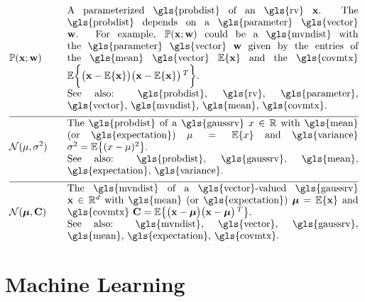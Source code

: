 \begin{align} 
	&\prob{\featurevec;\weights} &\quad & \parbox{.85\textwidth}{A parameterized \gls{probdist} of an \gls{rv} $\featurevec$. 
		The \gls{probdist} depends on a \gls{parameter} \gls{vector} $\weights$. For example, $\prob{\featurevec;\weights}$ could be a 
		\gls{mvndist} with the \gls{parameter} \gls{vector} $\weights$ given by the entries of the \gls{mean} \gls{vector} $\expect \{ \featurevec \}$ 
		and the \gls{covmtx} $\expect \bigg \{ \big( \featurevec - \expect \{ \featurevec \}\big) \big( \featurevec - \expect \{ \featurevec \}\big)\,^{T}  \bigg\}$.
		\\ See also: \gls{probdist}, \gls{rv}, \gls{parameter}, \gls{vector}, \gls{mvndist}, \gls{mean}, \gls{covmtx}.} \nonumber \\[2mm] \hline \nonumber\\[-5mm]
	&\mathcal{N}(\mu, \sigma^{2}) &\quad & \parbox{.85\textwidth}{The \gls{probdist} of a 
		\gls{gaussrv} $\feature \in \mathbb{R}$ with \gls{mean} (or \gls{expectation}) $\mu= \expect \{ \feature \}$ 
		and \gls{variance} $\sigma^{2} =   \expect \big\{  (  \feature - \mu )^2 \big\}$.
		\\ See also: \gls{probdist}, \gls{gaussrv}, \gls{mean}, \gls{expectation}, \gls{variance}.} \nonumber \\[2mm] \hline \nonumber\\[-5mm]
	&\mathcal{N}(\meanvecgeneric, \mathbf{C}) &\quad & \parbox{.85\textwidth}{The \gls{mvndist} of a \gls{vector}-valued 
		\gls{gaussrv} $\featurevec \in \mathbb{R}^{\featuredim}$ with \gls{mean} (or \gls{expectation}) $\clustermean= \expect \{ \featurevec \}$ 
		and \gls{covmtx} $\mathbf{C} =  \expect \big\{ \big( \featurevec - \clustermean \big)\big( \featurevec - \clustermean \big)\,^{T} \big\}$.
		\\ See also: \gls{mvndist}, \gls{vector}, \gls{gaussrv}, \gls{mean}, \gls{expectation}, \gls{covmtx}.} \nonumber                                             
\end{align}





\newpage
\section*{Machine Learning}

